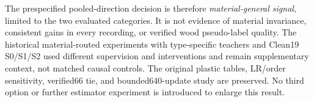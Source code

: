 The prespecified pooled-direction decision is therefore \emph{material-general signal}, limited to the two evaluated categories. It is not evidence of material invariance, consistent gains in every recording, or verified wood pseudo-label quality. The historical material-routed experiments with type-specific teachers and Clean19 S0/S1/S2 used different supervision and interventions and remain supplementary context, not matched causal controls. The original plastic tables, LR/order sensitivity, verified66 tie, and bounded640-update study are preserved. No third option or further estimator experiment is introduced to enlarge this result.
